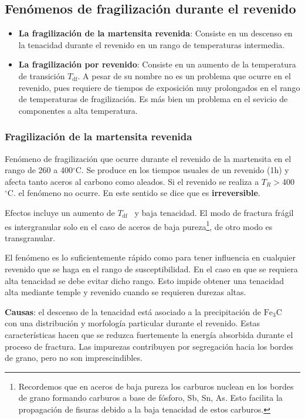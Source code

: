 \documentclass{article}
\newcommand{\Tdf}{\ensuremath{T_{\mathrm{df}}}}
\newcommand{\grad}{\ensuremath{^\circ \mathrm{C}}}
\newcommand{\cementita}{\ensuremath{\mathrm{Fe}_3 \mathrm{C}}}
\begin{document}
\subsection{Fenómenos de fragilización durante el revenido}
\begin{itemize}
    \item \textbf{La fragilización de la martensita revenida}: Consiste en un descenso en la tenacidad durante el revenido en un rango de temperaturas intermedia.
    \item \textbf{La fragilización por revenido}: Consiste en un aumento de la temperatura de transición \Tdf. A pesar de su nombre no es un problema que ocurre en el revenido, pues requiere de tiempos de exposición muy prolongados en el rango de temperaturas de fragilización. Es más bien un problema en el sevicio de componentes a alta temperatura.
\end{itemize}

\subsubsection{Fragilización de la martensita revenida}
Fenómeno de fragilización que ocurre durante el revenido de la martensita en el rango de 260 a 400\grad{}. Se produce en los tiempos usuales de un revenido (1h) y afecta tanto aceros al carbono como aleados. Si el revenido se realiza a $T_R>$400\grad. el fenómeno no ocurre. En este sentido se dice que es \textbf{irreversible}.

Efectos incluye un aumento de \Tdf~ y baja tenacidad. El modo de fractura frágil es intergranular solo en el caso de aceros de baja pureza\footnote{Recordemos que en aceros de baja pureza los carburos nuclean en los bordes de grano formando carburos a base de fósforo, Sb, Sn, As. Esto facilita la propagación de fisuras debido a la baja tenacidad de estos carburos.}, de otro modo es transgranular.

El fenómeno es lo suficientemente rápido como para tener influencia en cualquier revenido que se haga en el rango de susceptibilidad. En el caso en que se requiera alta tenacidad se debe evitar dicho rango. Esto impide obtener una tenacidad alta mediante temple y revenido cuando se requieren durezas altas.

\textbf{Causas}: el descenso de la tenacidad está asociado a la precipitación de \cementita~ con una distribución y morfología particular durante el revenido. Estas características hacen que se reduzca fuertemente la energía absorbida durante el proceso de fractura. Las impurezas contribuyen por segregación hacia los bordes de grano, pero no son imprescindibles.
\end{document}
